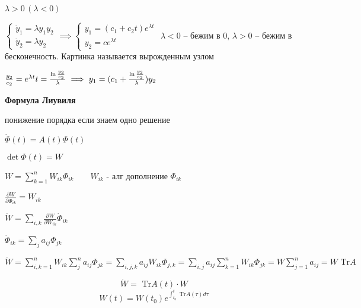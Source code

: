 \documentclass[12pt, a4paper]{article}
\begin{document}
     $\lambda > 0 \,(\lambda < 0)$

    \quad$\begin{cases}
        \dot y_1 = \lambda y_1 y_2 \\ \dot y_2 = \lambda y_2
    \end{cases} \implies 
    \begin{cases}
        y_1 = (c_1 + c_2t)e^{\lambda t}\\
        y_2 = ce^{\lambda t}
    \end{cases}$
    $\lambda < 0 $ -- бежим в 0, $\lambda > 0$ -- бежим в бесконечность. 
    Картинка называется вырожденным узлом

    $\frac{y_2}{c_2} = e^{\lambda t}\\ 
    t = \frac{\ln \frac{y_2}{c_2}}{\lambda} \implies 
    y_1 = (c_1 + \frac{\ln \frac{y_2}{c_2}}{\lambda})y_2$

    \textbf{Формула Лиувиля}
    
    понижение порядка если знаем одно решение

    $\dot \Phi(t) = A(t)\Phi(t)$

    $\det \Phi(t) = W$ %

    $W = \sum^n_{k=1} W_{ik} \Phi_{ik}\qquad W_{ik}$ - алг дополнение $\Phi_{ik}$

    $\displaystyle\frac{\partial W}{\partial \Phi_{ik}} = W_{ik}$

    $\dot W = \sum_{i,k} \frac{\partial W}{\partial W_{ik}}\dot\Phi_{ik}$

    $\dot\Phi_{ik} = \sum_j a_{ij} \Phi_{jk}$

    $\dot W = \sum_{i,k =1}^n W_{ik}\sum_j^n a_{ij}\Phi_{jk} = 
    \sum_{i,j,k}a_{ij}W_{ik} \Phi_{j,k} = 
    \sum_{i,j}a_{ij}\sum^n_{k=1}W_{ik}\Phi_{jk} = W \sum^n_{j=1}a_{ij} = 
    W\text { Tr} A$

    $$\dot W = \text{ Tr}A(t) \cdot W$$
    $$W(t) = W(t_0)e^{\int^t_{t_0} \text{ Tr}A (\tau)d\tau}$$
\end{document}
